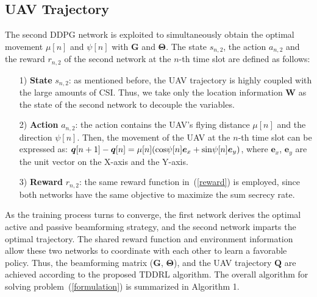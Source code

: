 \documentclass[12pt, draftclsnofoot, onecolumn]{IEEEtran}
\begin{document}
\subsection{UAV Trajectory}
The second DDPG network is exploited to simultaneously obtain the optimal movement ${\mu}[n]$ and $\psi[n]$ with ${\bm G}$ and $\bm{\Theta}$. The state $s_{n,2}$, the action $a_{n,2}$ and the reward $r_{n,2}$ of the second network at the $n$-th time slot are defined as follows:
\begin{itemize}
  \item [1)] 
  \textbf{State} $s_{n,2}$: as mentioned before, the UAV trajectory is highly coupled with the large amounts of CSI. Thus, we take only the location information ${\bm W}$ as the state of the second network to decouple the variables.
  \item [2)]
  \textbf{Action} $a_{n,2}$: the action contains the UAV's flying distance $\mu[n] $ and the direction $\psi[n] $. Then, the movement of the UAV at the $n$-th time slot can be expressed as:
    ${\bm q}[n+1]-{\bm{q}}[n]=\mu[n]({\rm cos}\psi[n] {\bm{e}}_x+ {\rm sin}\psi[n] {\bm{e}}_y)$, 
    where ${\bm{e}}_x$, ${\bm{e}}_y$ are the unit vector on the X-axis and the Y-axis. 
  \item [3)]
  \textbf{Reward} $r_{n,2}$: the same reward function in~(\ref{reward}) is employed, since both networks have the same objective to maximize the sum secrecy rate.
\end{itemize}

As the training process turns to converge, the first network derives the optimal active and passive beamforming strategy, and the second network imparts the optimal trajectory. The shared reward function and environment information allow these two networks to coordinate with each other to learn a favorable policy. Thus, the beamforming matrix (${\bm G}$, ${\bm \Theta}$), and the UAV trajectory ${\bm Q}$ are achieved according to the proposed TDDRL algorithm. The overall algorithm for solving problem~(\ref{formulation}) is summarized in Algorithm 1. 
\end{document}
